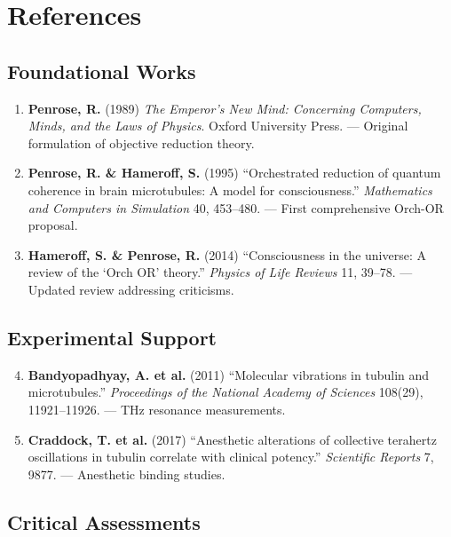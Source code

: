 \section{References}

\subsection{Foundational Works}

\begin{enumerate}
\item \textbf{Penrose, R.} (1989) \textit{The Emperor's New Mind: Concerning Computers, Minds, and the Laws of Physics}. Oxford University Press. --- Original formulation of objective reduction theory.

\item \textbf{Penrose, R. \& Hameroff, S.} (1995) ``Orchestrated reduction of quantum coherence in brain microtubules: A model for consciousness.'' \textit{Mathematics and Computers in Simulation} 40, 453--480. --- First comprehensive Orch-OR proposal.

\item \textbf{Hameroff, S. \& Penrose, R.} (2014) ``Consciousness in the universe: A review of the `Orch OR' theory.'' \textit{Physics of Life Reviews} 11, 39--78. --- Updated review addressing criticisms.
\end{enumerate}

\subsection{Experimental Support}

\begin{enumerate}
\setcounter{enumi}{3}
\item \textbf{Bandyopadhyay, A. et al.} (2011) ``Molecular vibrations in tubulin and microtubules.'' \textit{Proceedings of the National Academy of Sciences} 108(29), 11921--11926. --- THz resonance measurements.

\item \textbf{Craddock, T. et al.} (2017) ``Anesthetic alterations of collective terahertz oscillations in tubulin correlate with clinical potency.'' \textit{Scientific Reports} 7, 9877. --- Anesthetic binding studies.
\end{enumerate}

\subsection{Critical Assessments}

